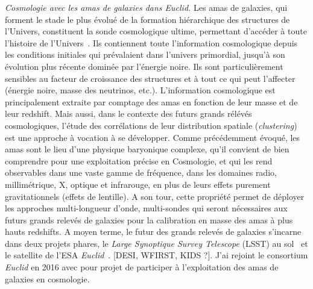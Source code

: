 \emph{Cosmologie avec les amas de galaxies dans Euclid.}
Les amas de galaxies, qui forment le stade le plus évolué
de la formation hiérarchique des structures de l’Univers, constituent la
sonde cosmologique ultime, permettant d’accéder à toute l’histoire de
l’Univers~. Ils contiennent toute l’information
cosmologique depuis les conditions initiales qui prévalaient dans
l’univers primordial, jusqu’à son évolution plus récente dominée par
l’énergie noire. Ils sont particulièrement sensibles au facteur de
croissance des structures et à tout ce qui peut l’affecter (énergie
noire, masse des neutrinos, etc.).
L’information cosmologique est principalement extraite par comptage
des amas en fonction de leur masse et de leur redshift. Mais aussi,
dans le contexte des futurs grands rélévés cosmologiques, l’étude des
corrélations de leur distribution spatiale (\emph{clustering}) est une
approche à vocation à se développer.
Comme précédemment évoqué, les amas sont le lieu d’une physique baryonique
complexe, qu’il convient de bien comprendre pour une exploitation
précise en Cosmologie, et qui les rend observables dans une vaste
gamme de fréquence, dans les domaines radio, millimétrique, X, optique
et infrarouge, en plus de leurs effets purement gravitationnels (effets de
lentille). A son tour, cette propriété permet de déployer les
approches multi-longueur d’onde, multi-sondes qui seront nécessaires
aux futurs grands relevés de galaxies pour la calibration en masse des
amas à plus hauts redshifts.
A moyen terme, le futur des grands relevés de galaxies s'incarne dans
deux projets phares, le \emph{Large Synoptique Survey Telescope}
(LSST) au sol~ et le satellite de
l'ESA \emph{Euclid}~. [DESI, WFIRST, KIDS ?]. J'ai
rejoint le consortium \emph{Euclid} en 2016 avec pour projet de
participer à l'exploitation des amas de galaxies en cosmologie.\\


